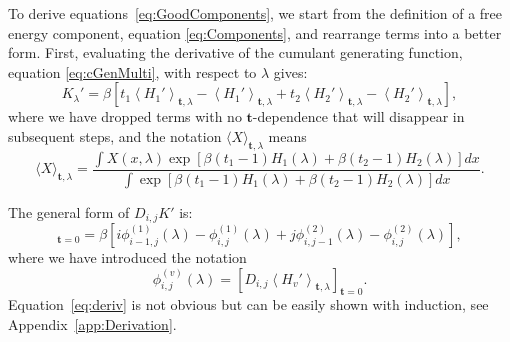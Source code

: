 \documentclass{article}
\let\vec\mathbf
\begin{document}
To derive equations~\ref{eq:GoodComponents}, we start from the definition of a free energy component, equation \ref{eq:Components}, and rearrange terms into a better form. First, evaluating the derivative of the cumulant generating function, equation \ref{eq:cGenMulti}, with respect to $\lambda$ gives:
\begin{equation}
K_\lambda' = 
	\beta \left[
		t_1 \left\langle H_1' \right\rangle_{\vec t,\lambda} -
    	\left\langle H_1' \right\rangle_{\vec t,\lambda} +
	    t_2 \left\langle H_2' \right\rangle_{\vec t,\lambda} -
    	\left\langle H_2' \right\rangle_{\vec t,\lambda}
    \right], 
    \label{eq:kprime}
\end{equation}
where we have dropped terms with no $\vec t$-dependence that will disappear in subsequent steps, and the notation $\langle X \rangle_{\vec t, \lambda}$ means
\begin{equation}
\langle X \rangle_{\vec t, \lambda}  =
	\frac
    	{\int X(x, \lambda) 
        	\exp\left[
        		\beta(t_1-1)H_1(\lambda) +
            \beta(t_2-1)H_2(\lambda)
        \right] dx
        }
    	{\int
        	\exp\left[
            \beta(t_1-1)H_1(\lambda) +
            \beta(t_2-1)H_2(\lambda)
        \right] dx
        }.
\end{equation}

The general form of $D_{i,j}K'$ is:
\begin{equation}
[D_{i,j}K_\lambda']_{\vec t=0} =
	\beta\left[
		i \phi_{i-1, j}^{(1)}(\lambda) -
    	\phi_{i,j}^{(1)}(\lambda) +
    	j \phi_{i, j-1}^{(2)}(\lambda) -
    	\phi_{i,j}^{(2)}(\lambda)
    \right],
\label{eq:deriv}
\end{equation}
where we have introduced the notation
\begin{equation}
\phi_{i,j}^{(v)}(\lambda) =
	\left[ D_{i,j} \left\langle
    	H_v'
    \right\rangle_{\vec t, \lambda} \right]_{\vec t=0}.
    \label{eq:phi}
\end{equation}
Equation~\ref{eq:deriv} is not obvious but can be easily shown with induction, see Appendix~\ref{app:Derivation}. 
\end{document}
